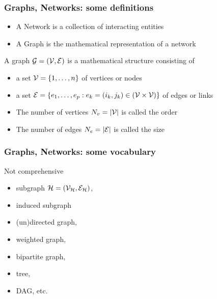 \documentclass{beamer}\usepackage[]{graphicx}\usepackage[]{color}
\begin{document}
\begin{frame}
  \frametitle{Graphs, Networks: some definitions}

  \begin{definition}
    \vspace{-.25cm}
    \begin{itemize}
      \item  A \alert{Network} is a collection of interacting entities
      \item  A \alert{Graph} is the mathematical representation of a network
    \end{itemize}
  \end{definition}

  \vfill

  \begin{definition}[Graph]
    A graph $\mathcal{G}=(\mathcal{V},\mathcal{E})$ is a mathematical structure consisting of
    \begin{itemize}
      \item a set $\mathcal{V}=\left\{1,\dots,n\right\}$ of \alert{vertices} or \alert{nodes} 
      \item a set $\mathcal{E}=\left\{e_1,\dots,e_p:e_k=(i_k,j_k)\in (\mathcal{V}\times\mathcal{V})\right\}$ of \alert{edges} or \alert{links} 
      \item The number of vertices $N_v=|\mathcal{V}|$ is called the \alert{order}
      \item The number of edges $N_e=|\mathcal{E}|$ is called the \alert{size}
    \end{itemize}
  \end{definition}

\end{frame}

\begin{frame}
  \frametitle{Graphs, Networks: some vocabulary}

  \begin{block}{Not comprehensive}
    \begin{itemize}
      \item subgraph $\mathcal{H} = (\mathcal{V}_{\mathcal{H}}, \mathcal{E}_{\mathcal{H}})$, 
      \item  induced subgraph
      \item (un)directed graph, 
      \item  weighted graph, 
      \item  bipartite graph, 
      \item  tree, 
      \item  DAG, etc.
    \end{itemize}
  \end{block}

\end{frame}
\end{document}

